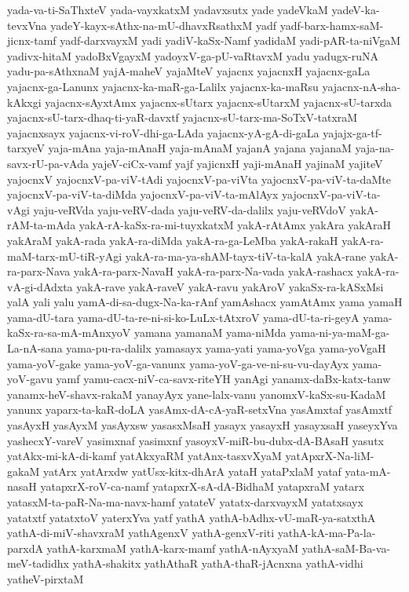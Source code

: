 {yada-va-ti-SaThxteV
yada-vayxkatxM
yadavxsutx
yade
yadeVkaM
yadeV-ka-tevxVna
yadeY-kayx-sAthx-na-mU-dhavxRsathxM
yadf
yadf-barx-hamx-saM-jicnx-tamf
yadf-darxvayxM
yadi
yadiV-kaSx-Namf
yadidaM
yadi-pAR-ta-niVgaM
yadivx-hitaM
yadoBxVgayxM
yadoyxV-ga-pU-vaRtavxM
yadu
yadugx-ruNA
yadu-pa-sAthxnaM
yajA-maheV
yajaMteV
yajacnx
yajacnxH
yajacnx-gaLa
yajacnx-ga-Lanunx
yajacnx-ka-maR-ga-Lalilx
yajacnx-ka-maRsu
yajacnx-nA-sha-kAkxgi
yajacnx-sAyxtAmx
yajacnx-sUtarx
yajacnx-sUtarxM
yajacnx-sU-tarxda
yajacnx-sU-tarx-dhaq-ti-yaR-davxtf
yajacnx-sU-tarx-ma-SoTxV-tatxraM
yajacnxsayx
yajacnx-vi-roV-dhi-ga-LAda
yajacnx-yA-gA-di-gaLa
yajajx-ga-tf-tarxyeV
yaja-mAna
yaja-mAnaH
yaja-mAnaM
yajanA
yajana
yajanaM
yaja-na-savx-rU-pa-vAda
yajeV-ciCx-vamf
yajf
yajicnxH
yaji-mAnaH
yajinaM
yajiteV
yajocnxV
yajocnxV-pa-viV-tAdi
yajocnxV-pa-viVta
yajocnxV-pa-viV-ta-daMte
yajocnxV-pa-viV-ta-diMda
yajocnxV-pa-viV-ta-mAlAyx
yajocnxV-pa-viV-ta-vAgi
yaju-veRVda
yaju-veRV-dada
yaju-veRV-da-dalilx
yaju-veRVdoV
yakA-rAM-ta-mAda
yakA-rA-kaSx-ra-mi-tuyxkatxM
yakA-rAtAmx
yakAra
yakAraH
yakAraM
yakA-rada
yakA-ra-diMda
yakA-ra-ga-LeMba
yakA-rakaH
yakA-ra-maM-tarx-mU-tiR-yAgi
yakA-ra-ma-ya-shAM-tayx-tiV-ta-kalA
yakA-rane
yakA-ra-parx-Nava
yakA-ra-parx-NavaH
yakA-ra-parx-Na-vada
yakA-rashacx
yakA-ra-vA-gi-dAdxta
yakA-rave
yakA-raveV
yakA-ravu
yakAroV
yakaSx-ra-kASxMsi
yalA
yali
yalu
yamA-di-sa-dugx-Na-ka-rAnf
yamAshacx
yamAtAmx
yama
yamaH
yama-dU-tara
yama-dU-ta-re-ni-si-ko-LuLx-tAtxroV
yama-dU-ta-ri-geyA
yama-kaSx-ra-sa-mA-mAnxyoV
yamana
yamanaM
yama-niMda
yama-ni-ya-maM-ga-La-nA-sana
yama-pu-ra-dalilx
yamasayx
yama-yati
yama-yoVga
yama-yoVgaH
yama-yoV-gake
yama-yoV-ga-vanunx
yama-yoV-ga-ve-ni-su-vu-dayAyx
yama-yoV-gavu
yamf
yamu-cacx-niV-ca-savx-riteYH
yanAgi
yanamx-daBx-katx-tanw
yanamx-heV-shavx-rakaM
yanayAyx
yane-lalx-vanu
yanomxV-kaSx-su-KadaM
yanunx
yaparx-ta-kaR-doLA
yasAmx-dA-cA-yaR-setxVna
yasAmxtaf
yasAmxtf
yasAyxH
yasAyxM
yasAyxsw
yasasxMsaH
yasayx
yasayxH
yasayxsaH
yaseyxYva
yashecxY-vareV
yasimxnaf
yasimxnf
yasoyxV-miR-bu-dubx-dA-BAsaH
yasutx
yatAkx-mi-kA-di-kamf
yatAkxyaRM
yatAnx-tasxvXyaM
yatApxrX-Na-liM-gakaM
yatArx
yatArxdw
yatUsx-kitx-dhArA
yataH
yataPxlaM
yataf
yata-mA-nasaH
yatapxrX-roV-ca-namf
yatapxrX-sA-dA-BidhaM
yatapxraM
yatarx
yatasxM-ta-paR-Na-ma-navx-hamf
yatateV
yatatx-darxvayxM
yatatxsayx
yatatxtf
yatatxtoV
yaterxYva
yatf
yathA
yathA-bAdhx-vU-maR-ya-satxthA
yathA-di-miV-shavxraM
yathAgenxV
yathA-genxV-riti
yathA-kA-ma-Pa-la-parxdA
yathA-karxmaM
yathA-karx-mamf
yathA-nAyxyaM
yathA-saM-Ba-va-meV-tadidhx
yathA-shakitx
yathAthaR
yathA-thaR-jAcnxna
yathA-vidhi
yatheV-pirxtaM
}

